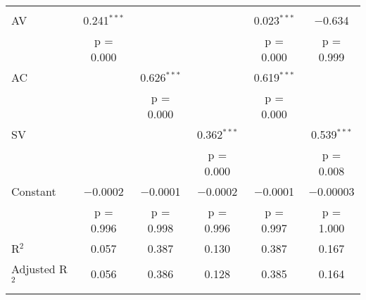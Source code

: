 
\begin{tabular}{@{\extracolsep{5pt}}lccccc} 
\\[-1.8ex]
\hline \\[-1.8ex] 
 AV & 0.241$^{***}$ &  &  & 0.023$^{***}$ & $-$0.634 \\ 
  & p = 0.000 &  &  & p = 0.000 & p = 0.999 \\ 
 AC &  & 0.626$^{***}$ &  & 0.619$^{***}$ &  \\ 
  &  & p = 0.000 &  & p = 0.000 &  \\ 
 SV &  &  & 0.362$^{***}$ &  & 0.539$^{***}$ \\ 
  &  &  & p = 0.000 &  & p = 0.008 \\ 
 Constant & $-$0.0002 & $-$0.0001 & $-$0.0002 & $-$0.0001 & $-$0.00003 \\ 
  & p = 0.996 & p = 0.998 & p = 0.996 & p = 0.997 & p = 1.000 \\ 
R$^{2}$ & 0.057 & 0.387 & 0.130 & 0.387 & 0.167 \\ 
Adjusted R$^{2}$ & 0.056 & 0.386 & 0.128 & 0.385 & 0.164 \\ 
\hline \\[-1.8ex] 
\end{tabular} 
